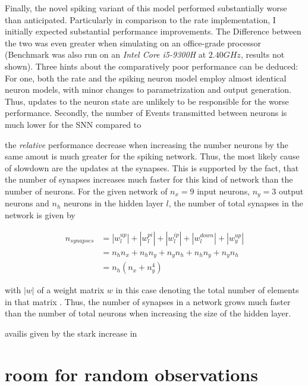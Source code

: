 Finally, the novel spiking variant of this model performed substantially worse than anticipated. Particularly in
comparison to the rate implementation, I initially expected substantial performance improvements. The Difference between
the two was even greater when simulating on an office-grade processor (Benchmark was also run on an \textit{Intel Core
i5-9300H} at $2.40GHz$, results not shown). Three hints about the comparatively poor performance can be deduced: For
one, both the rate and the spiking neuron model employ almost identical neuron models, with minor changes to
parametrization and output generation. Thus, updates to the neuron state are unlikely to be responsible for the worse
performance. Secondly, the number of Events transmitted between neurons is much lower for the SNN compared to

the \textit{relative} performance decrease when increasing the number neurons by the same amout is much greater for the
spiking network. Thus, the most likely cause of slowdown are the updates at the synapses. This is supported by the fact,
that the number of synapses increases much faster for this kind of network than the number of neurons. For the given
network of $n_{x} = 9$ input neurons, $n_y = 3$ output neurons and $n_{h}$ neurons in the hidden layer $l$, the number
of total synapses in the network is given by

\begin{align}
    n_{synapses} & = |w_{l}^{up}| + |w_{l}^{pi}| + |w_{l}^{ip}| + |w_{l}^{down}| + |w_{y}^{up}| \\
                 & = n_h n_x + n_h n_y + n_y n_h  + n_h n_y + n_y  n_h                          \\
                 & = n_h (n_x + n_y^4)
\end{align}

with $|w|$ of a weight matrix $w$ in this case denoting the total number of elements in that matrix . Thus, the number of synapses in a network grows much faster than the number of total
    neurons when increasing the size of the hidden layer.

availis given by the stark increase in









\chapter{room for random observations}

